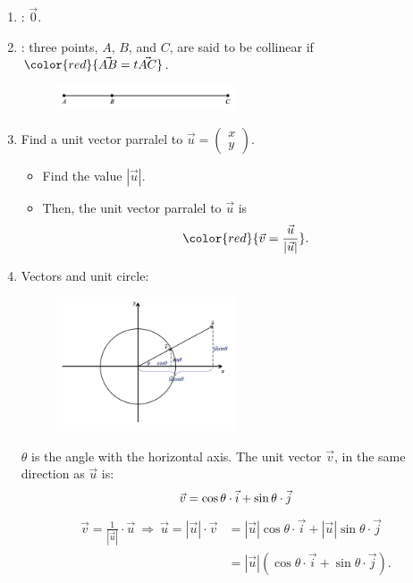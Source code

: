 \documentclass[12pt, a4paper]{article}
\begin{document}
\begin{enumerate}
\begin{proof}{2.1.1}{}
$$\begin{aligned}
    \end{aligned}$$
  \end{proof}
  \item \textbf{\color{red}{Zero vector}}: $\vec{0}$.
  \item \textbf{\color{red}{Collinear points}}: three points, $A$, $B$, and $C$, are said to be collinear if ${\color{red}{\vec{AB}=t\vec{AC}}}$.
  \begin{figure}[H]
    \centering
    \includegraphics[width=0.5\textwidth]{Fig.5.jpg}
  \end{figure}
  \item Find a unit vector parralel to $\vec{u}=\begin{pmatrix}x\\y\end{pmatrix}.$
  \begin{itemize}
    \item Find the value $\left|\vec{u}\right|.$
    \item Then, the unit vector parralel to $\vec{u}$ is 
    $${\color{red}{\vec{v}=\frac{\vec{u}}{\left|\vec{u}\right|}}}.$$
  \end{itemize}
  \item Vectors and unit circle: 
  \begin{figure}[H]
    \centering
    \includegraphics[width=0.5\textwidth]{Fig.6.jpg}
  \end{figure}
  $\theta$ is the angle with the horizontal axis. The unit vector $\vec{v}$, in the same direction as $\vec{u}$ is: 
  $$\vec{v}=\cos\theta\cdot\vec{i}+\sin\theta\cdot\vec{j}\\$$
  $$\begin{aligned}
    \vec{v}=\frac{1}{\left|\vec{u}\right|}\cdot\vec{u}\ \Rightarrow\ \vec{u}=\left|\vec{u}\right|\cdot\vec{v}&=\left|\vec{u}\right|\cos\theta\cdot\vec{i}+\left|\vec{u}\right|\sin\theta\cdot\vec{j}\\
    &=\left|\vec{u}\right|\left(\cos\theta\cdot\vec{i}+\sin\theta\cdot\vec{j}\right).
  \end{aligned}$$
\end{enumerate}
\end{document}
